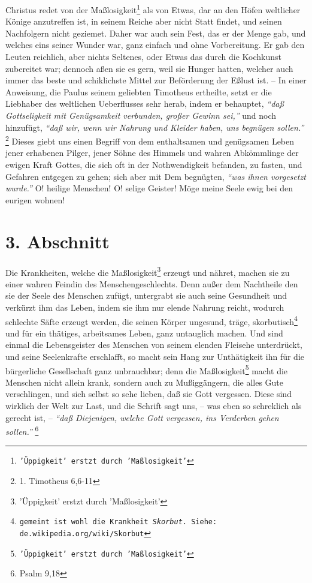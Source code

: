 \medskip

Christus redet von der Maßlosigkeit\footnote{\texttt{'Üppigkeit' erstzt durch 'Maßlosigkeit'}} als von Etwas, dar an den Höfen weltlicher
Könige anzutreffen ist, in seinem Reiche aber nicht Statt findet, und seinen
Nachfolgern nicht geziemet. Daher war auch sein Fest, das er der Menge gab, und
welches eins seiner Wunder war, ganz einfach und ohne Vorbereitung. Er gab den
Leuten reichlich, aber nichts Seltenes, oder Etwas das durch die Kochkunst
zubereitet war; dennoch aßen sie es gern, weil sie Hunger hatten, welcher auch
immer das beste und schiklichste Mittel zur Beförderung der Eßlust ist. -- In
einer Anweisung, die Paulus seinem geliebten Timotheus ertheilte, setzt er die
Liebhaber des weltlichen Ueberflusses sehr herab, indem er behauptet,
\textit{"`daß Gottseligkeit mit Genügsamkeit verbunden, großer Gewinn sei,"'} und noch hinzufügt, \textit{"`daß wir, wenn wir Nahrung und Kleider haben, uns begnügen
sollen."'}
\footnote{1. Timotheus 6,6-11}
Dieses giebt uns einen Begriff von dem
enthaltsamen und genügsamen Leben jener erhabenen Pilger, jener Söhne des Himmels und wahren Abkömmlinge der ewigen Kraft Gottes, die sich oft in der
Nothwendigkeit befanden, zu fasten, und Gefahren entgegen zu gehen; sich aber
mit Dem begnügten, \textit{"`was ihnen vorgesetzt wurde."'} O! heilige Menschen! O!
selige Geister! Möge meine Seele ewig bei den eurigen wohnen!

\section{3. Abschnitt} \label{kap14_ab3}

Die Krankheiten, welche die Maßlosigkeit\footnote{'Üppigkeit' erstzt durch 'Maßlosigkeit'} erzeugt und nähret, machen sie zu einer
wahren Feindin des Menschengeschlechts. Denn außer dem Nachtheile den sie der
Seele des Menschen zufügt, untergrabt sie auch seine Gesundheit und verkürzt ihm
das Leben, indem sie ihm nur elende Nahrung reicht, wodurch schlechte Säfte
erzeugt werden, die seinen Körper ungesund, träge, skorbutisch\footnote{\texttt{gemeint ist
wohl die Krankheit \textit{Skorbut}. Siehe: de.wikipedia.org/wiki/Skorbut}} und für ein thätiges,
arbeitsames Leben, ganz untauglich machen. Und sind einmal die Lebensgeister des
Menschen von seinem elenden Fleisehe unterdrückt, und seine Seelenkrafte
erschlafft, so macht sein Hang zur Unthätigkeit ihn für die bürgerliche Gesellschaft
 ganz unbrauchbar; denn die Maßlosigkeit\footnote{\texttt{'Üppigkeit' erstzt durch 'Maßlosigkeit'}} macht die Menschen nicht
allein krank, sondern auch zu Mußiggängern, die alles Gute verschlingen, und
sich selbst so sehe lieben, daß sie Gott vergessen. Diese sind wirklich der Welt
zur Last, und die Schrift sagt uns, -- was eben so schreklich als gerecht ist,
-- \textit{"`daß Diejenigen, welche Gott vergessen, ins Verderben gehen
sollen."'}
\footnote{Psalm 9,18}

